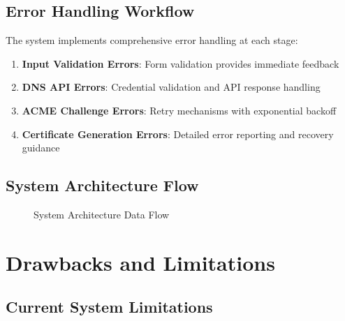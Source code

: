\subsection{Error Handling Workflow}

The system implements comprehensive error handling at each stage:

\begin{enumerate}
    \item \textbf{Input Validation Errors}: Form validation provides immediate feedback
    \item \textbf{DNS API Errors}: Credential validation and API response handling
    \item \textbf{ACME Challenge Errors}: Retry mechanisms with exponential backoff
    \item \textbf{Certificate Generation Errors}: Detailed error reporting and recovery guidance
\end{enumerate}

\subsection{System Architecture Flow}

\begin{figure}[h]
\centering
{}
\caption{System Architecture Data Flow}
\label{fig:system-architecture-flow}
\end{figure}

\section{Drawbacks and Limitations}

\subsection{Current System Limitations}

